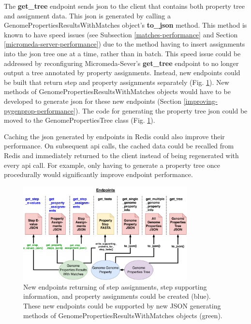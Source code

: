 The \textbf{get\_tree} endpoint sends \gls{json} to the client that contains both property tree and assignment data. This \gls{json} is generated by calling a GenomePropertiesResultsWithMatches object's \textbf{to\_json} method. This method is known to have speed issues (see Subsection \ref{matches-performance} and Section \ref{micromeda-server-performance}) due to the method having to insert assignments into the \gls{json} tree one at a time, rather than in batch. This speed issue could be addressed by reconfiguring Micromeda-Sever's \textbf{get\_tree} endpoint to no longer output a tree annotated by property assignments. Instead, new endpoints could be built that return step and property assignments separately (Fig. \ref{fig:new_endpoints}). New methods of GenomePropertiesResultsWithMatches objects would have to be developed to generate \gls{json} for these new endpoints (Section \ref{improving-pygenprop-performance}). The code for generating the property tree \gls{json} could be moved to the GenomePropertiesTree class (Fig. \ref{fig:new_endpoints}).

Caching the \gls{json} generated by endpoints in Redis could also improve their performance. On subsequent \gls{api} calls, the cached data could be recalled from Redis and immediately returned to the client instead of being regenerated with every \gls{api} call. For example, only having to generate a property tree once procedurally would significantly improve endpoint performance.

\begin{figure}[!ht]
  \centering
	\includegraphics[width=0.8\textwidth]{media/micromeda-server-new-endpoints.pdf}
	 \caption{New endpoints returning of step assignments, step supporting information, and property assignments could be created (blue). These new endpoints could be supported by new JSON generating methods of GenomePropertiesResultsWithMatches objects (green).}
	 \label{fig:new_endpoints}
\end{figure}

